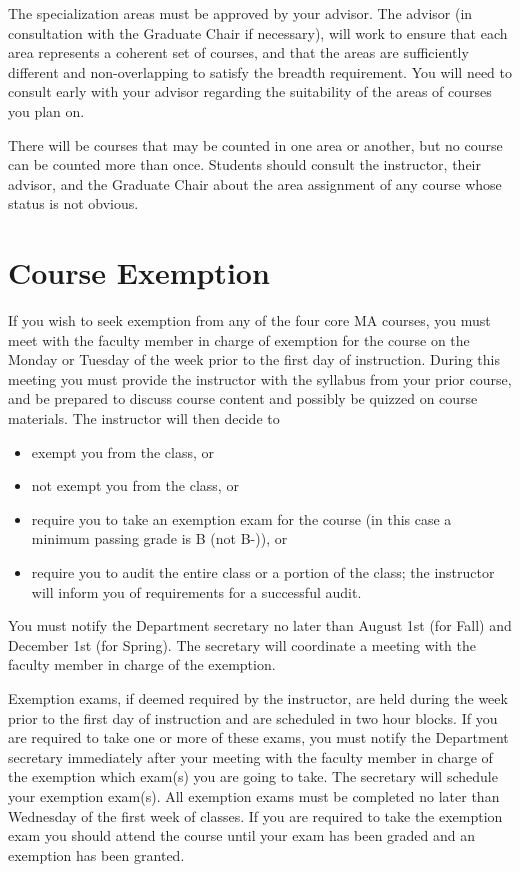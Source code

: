 \documentclass[
]{book}
\providecommand{\tightlist}{%
  \setlength{\itemsep}{0pt}\setlength{\parskip}{0pt}}
\begin{document}
The specialization areas must be approved by your advisor. The advisor (in consultation with the Graduate Chair if necessary), will work to ensure that each area represents a coherent set of courses, and that the areas are sufficiently different and non-overlapping to satisfy the breadth requirement. You will need to consult early with your advisor regarding the suitability of the areas of courses you plan on.

There will be courses that may be counted in one area or another, but no course can be counted more than once. Students should consult the instructor, their advisor, and the Graduate Chair about the area assignment of any course whose status is not obvious.

\section{Course Exemption}\label{course-exemption}

If you wish to seek exemption from any of the four core MA courses, you must meet with the faculty member in charge of exemption for the course on the Monday or Tuesday of the week prior to the first day of instruction. During this meeting you must provide the instructor with the syllabus from your prior course, and be prepared to discuss course content and possibly be quizzed on course materials. The instructor will then decide to

\begin{itemize}
\tightlist
\item
  exempt you from the class, or
\item
  not exempt you from the class, or
\item
  require you to take an exemption exam for the course (in this case a minimum passing grade is B (not B-)), or
\item
  require you to audit the entire class or a portion of the class; the instructor will inform you of requirements for a successful audit.
\end{itemize}

You must notify the Department secretary no later than August 1st (for Fall) and December 1st (for Spring). The secretary will coordinate a meeting with the faculty member in charge of the exemption.

Exemption exams, if deemed required by the instructor, are held during the week prior to the first day of instruction and are scheduled in two hour blocks. If you are required to take one or more of these exams, you must notify the Department secretary immediately after your meeting with the faculty member in charge of the exemption which exam(s) you are going to take. The secretary will schedule your exemption exam(s). All exemption exams must be completed no later than Wednesday of the first week of classes. If you are required to take the exemption exam you should attend the course until your exam has been graded and an exemption has been granted.
\end{document}
